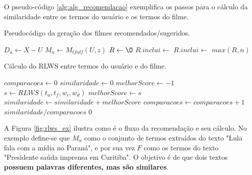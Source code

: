 O pseudo-código \ref{alg:alg_recomendacao} exemplifica os passos para o cálculo da similaridade entre os termos do usuário e os termos do filme.

\begin{algorithm}
    \label{alg:alg_recomendacao}
	\caption{Pseudocódigo da geração dos filmes recomendados/sugeridos.}
    \begin{algorithmic}[1]
        	\State $D_u \gets X - U$
        	\State $M_u \gets M_{tfidf}(U, z)$
        	\State $R \gets \O$
        			\State $R.inclui \gets$ 
				\Else
					\State $R.inclui \gets$ 	
        		\EndIf
        	\EndFor
        	\Return $max(R, n)$ 
        \EndFunction
    \end{algorithmic}
\end{algorithm}

\begin{algorithm}
	\caption{Cálculo do RLWS entre termos do usuário e do filme.}
	\begin{algorithmic}[1]
        	\State $comparacoes \gets 0$
        	\State $similaridade \gets 0$
        		\State $melhorScore\gets -1$
        			\State $s \gets RLWS(t_u, t_f, w_i, w_d)$
        				\State $melhorScore \gets s$
        			\EndIf
        		\EndFor
        			\State $similaridade \gets similaridade + melhorScore$
        			\State $comparacoes \gets comparacoes + 1$
        		\EndIf        		      	
        	\EndFor
				\Return $similaridade / comparacoes$
			\Else
				\Return $0$
			\EndIf
        \EndFunction
    \end{algorithmic}
\end{algorithm}

A Figura \ref{fig:rlws_ex} ilustra como é o fluxo da recomendação e seu cálculo. No exemplo define-se que $M_u$ como o conjunto de termos extraídos do texto "Lula fala com a mídia no Paraná", e por sua vez $F$ como os termos do texto "Presidente saúda imprensa em Curitiba". O objetivo é de que dois textos \textbf{possuem palavras diferentes, mas são similares}.

